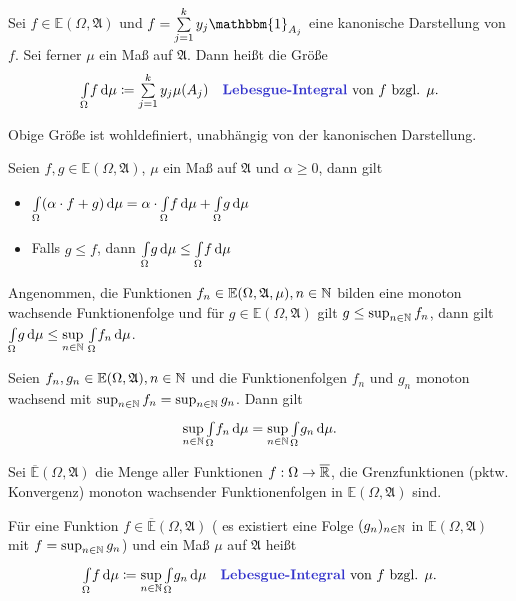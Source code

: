 \documentclass{cheat-sheet}
\newcommand{\Alg}{\mathfrak{A}} %
\newcommand{\E}{\mathbb{E}} %
\newcommand{\ind}{\mathbbm{1}} %
\theoremstyle{definition}
\newcommand{\IntOmu}[1]{\Int{\Omega}{}{#1}{\mu}} %
\begin{document}
\begin{defn}
  Sei $f \in \E(\Omega, \Alg)$ und $\textstyle f = \sum_{j=1}^k y_j \ind_{A_j}$ eine kanonische Darstellung von $f$. Sei ferner $\mu$ ein Maß auf $\Alg$. Dann heißt die Größe
  \[ \IntOmu{f} \coloneqq \sum_{j=1}^k y_j \mu(A_j) \quad \text{\emph{Lebesgue-Integral} von $f$ bzgl. $\mu$.} \]
\end{defn}

\begin{bem}
  Obige Größe ist wohldefiniert, \dh{} unabhängig von der kanonischen Darstellung.
\end{bem}

\begin{satz}
  Seien $f, g \in \E(\Omega, \Alg)$, $\mu$ ein Maß auf $\Alg$ und $\alpha \geq 0$, dann gilt
  \begin{itemize}
    \item $\IntOmu{(\alpha \cdot f + g)} = \alpha \cdot \IntOmu{f} + \IntOmu{g}$ 
    \item Falls $g \leq f$, dann $\IntOmu{g} \leq \IntOmu{f}$ 
  \end{itemize}
\end{satz}

\begin{satz}
  Angenommen, die Funktionen $f_n \in \E(\Omega, \Alg, \mu), n \in \N$ bilden eine monoton wachsende Funktionenfolge und für $g \in \E(\Omega, \Alg)$ gilt $g \leq \sup_{n \in \mathbb{N}} f_n$, dann gilt $\textstyle \IntOmu{g} \leq \sup\limits_{n \in \N} \, \IntOmu{f_n}$.
\end{satz}

\begin{kor}
  Seien $f_n, g_n \in \E(\Omega, \Alg), n \in \N$ und die Funktionenfolgen $f_n$ und $g_n$ monoton wachsend mit $\sup_{n \in \mathbb{N}} f_n = \sup_{n \in \mathbb{N}} g_n$. Dann gilt
  \[ \sup_{n \in \N} \IntOmu{f_n} = \sup_{n \in \N} \IntOmu{g_n}. \]
\end{kor}

\begin{defn}
  Sei $\overline{\E}(\Omega, \Alg)$ die Menge aller Funktionen $f : \Omega \to \overline{\mathbb{R}}$, die Grenzfunktionen (pktw. Konvergenz) monoton wachsender Funktionenfolgen in $\E(\Omega, \Alg)$ sind.
\end{defn}

\begin{defn}
  Für eine Funktion $f \in \overline{\E}(\Omega, \Alg)$ (\dh{} es existiert eine Folge $(g_n)_{n \in \mathbb{N}}$ in $\E(\Omega, \Alg)$ mit $f = \sup_{n \in \mathbb{N}} g_n$) und ein Maß $\mu$ auf $\Alg$ heißt
  \[ \IntOmu{f} \coloneqq \sup_{n \in \N} \IntOmu{g_n} \quad \text{\emph{Lebesgue-Integral} von $f$ bzgl. $\mu$.} \]
\end{defn}
\end{document}
